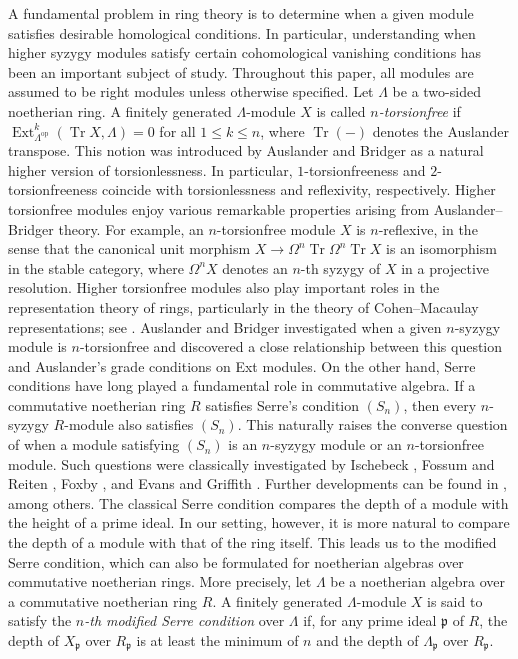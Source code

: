 \documentclass{amsart}
\theoremstyle{definition}
\theoremstyle{remark}
\numberwithin{equation}{thm}
\def\Ext{\operatorname{Ext}}
\def\le{\leqslant}
\def\p{\mathfrak{p}}
\def\syz{\Omega}
\def\tr{\operatorname{Tr}}
\begin{document}
A fundamental problem in ring theory is to determine when a given module satisfies desirable homological conditions. In particular, understanding when higher syzygy modules satisfy certain cohomological vanishing conditions has been an important subject of study. Throughout this paper, all modules are assumed to be right modules unless otherwise specified.
Let $\Lambda$ be a two-sided noetherian ring. A finitely generated $\Lambda$-module $X$ is called {\em $n$-torsionfree} if $\Ext^k_{\Lambda^{\mathrm{op}}}(\tr X,\Lambda)=0$ for all $1\le k\le n$, where $\tr(-)$ denotes the Auslander transpose. This notion was introduced by Auslander and Bridger \cite{AB} as a natural higher version of torsionlessness. In particular, $1$-torsionfreeness and $2$-torsionfreeness coincide with torsionlessness and reflexivity, respectively. Higher torsionfree modules enjoy various remarkable properties arising from Auslander--Bridger theory. For example, an $n$-torsionfree module $X$ is $n$-reflexive, in the sense that the canonical unit morphism $X\to\syz^n\tr\syz^n\tr X$ is an isomorphism in the stable category, where $\syz^n X$ denotes an $n$-th syzygy of $X$ in a projective resolution. Higher torsionfree modules also play important roles in the representation theory of rings, particularly in the theory of Cohen--Macaulay representations; see \cite{LW,Yos90}.
Auslander and Bridger \cite{AB} investigated when a given $n$-syzygy module is $n$-torsionfree and discovered a close relationship between this question and Auslander's grade conditions on Ext modules. On the other hand, Serre conditions have long played a fundamental role in commutative algebra. If a commutative noetherian ring $R$ satisfies Serre's condition $(S_n)$, then every $n$-syzygy $R$-module also satisfies $(S_n)$. This naturally raises the converse question of when a module satisfying $(S_n)$ is an $n$-syzygy module or an $n$-torsionfree module. Such questions were classically investigated by Ischebeck \cite{Is}, Fossum and Reiten \cite{FR}, Foxby \cite{Fox}, and Evans and Griffith \cite{EG}. Further developments can be found in \cite{Masek,MTT}, among others.
The classical Serre condition compares the depth of a module with the height of a prime ideal. In our setting, however, it is more natural to compare the depth of a module with that of the ring itself. This leads us to the modified Serre condition, which can also be formulated for noetherian algebras over commutative noetherian rings. More precisely, let $\Lambda$ be a noetherian algebra over a commutative noetherian ring $R$. A finitely generated $\Lambda$-module $X$ is said to satisfy the {\em $n$-th modified Serre condition} over $\Lambda$ if, for any prime ideal $\p$ of $R$, the depth of $X_\p$ over $R_\p$ is at least the minimum of $n$ and the depth of $\Lambda_\p$ over $R_\p$.
\end{document}
